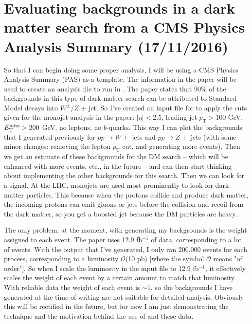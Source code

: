 \newpage
\chapter{Evaluating backgrounds in a dark matter search from a CMS Physics Analysis Summary (17/11/2016)}

So that I can begin doing some proper analysis, I will be using a CMS Physics Analysis Summary (PAS) \cite{CMS:2016pod} as a template. The information in the paper will be used to create an analysis file to run in \madanalysis. The paper states that 90\% of the backgrounds in this type of dark matter search can be attributed to Standard Model decays into $W^{\pm} / Z$ + jet. So I've created an input file for \madanalysis to apply the cuts given for the monojet analysis in the paper: $|\eta| < 2.5$, leading jet $p_{\mathrm{T}} > 100$ GeV, $E_{\mathrm{T}}^{\text{miss}} > 200$ GeV, no leptons, no $b$-quarks. This way I can plot the backgrounds that I generated previously for $pp \rightarrow W +$ jets and $pp \rightarrow Z +$ jets (with some minor changes: removing the lepton $p_{\mathrm{T}}$ cut, and generating more events). Then we get an estimate of these backgrounds for the DM search -- which will be enhanced with more events, etc., in the future -- and can then start thinking about implementing the other backgrounds for this search. Then we can look for a signal. At the LHC, monojets are used most prominently to look for dark matter particles. This because when the protons collide and produce dark matter, the incoming protons can emit gluons or jets before the collision and recoil from the dark matter, so you get a boosted jet because the DM particles are heavy.

The only problem, at the moment, with generating my backgrounds is the weight assigned to each event. The paper uses 12.9 fb$^{-1}$ of data, corresponding to a lot of events. With the \madgraph output that I've generated, I only ran 200,000 events for each process, corresponding to a luminosity $\mathcal{O}$(10 pb) [where the symbol $\mathcal{O}$ means "of order"]. So when I scale the luminosity in the \madanalysis input file to 12.9 fb$^{-1}$, it effectively scales the weight of each event by a certain amount to match that luminosity. With reliable data the weight of each event is $\sim$1, so the backgrounds I have generated at the time of writing are not suitable for detailed analysis. Obviously this will be rectified in the future, but for now I am just demonstrating the technique and the motivation behind the use of \madanalysis and these data.

